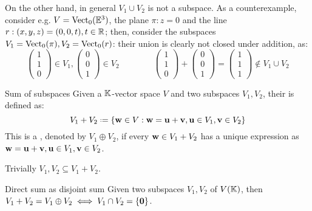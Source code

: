On the other hand, in general $ V_1 \cup V_2 $ is not a subspace. As a counterexample, consider e.g. $ V = \mathrm{Vect}_0(\mathbb{E}^3) $, the plane $ \pi : z = 0 $ and the line $ r : (x,y,z) = (0,0,t) , t \in \mathbb{R} $; then, consider the subspaces $ V_1 = \mathrm{Vect}_0(\pi) , V_2 = \mathrm{Vect}_0(r) $: their union is clearly not closed under addition, as:
\begin{equation*}
  \begin{pmatrix}
    1 \\ 1 \\ 0
  \end{pmatrix} \in V_1
  ,
  \begin{pmatrix}
    0 \\ 0 \\ 1
  \end{pmatrix} \in V_2
  \qquad \qquad
  \begin{pmatrix}
    1 \\ 1 \\ 0
  \end{pmatrix}
  +
  \begin{pmatrix}
    0 \\ 0 \\ 1
  \end{pmatrix}
  =
  \begin{pmatrix}
    1 \\ 1 \\ 1
  \end{pmatrix} \notin V_1 \cup V_2
\end{equation*}

\begin{definition}{Sum of subspaces}{}
  Given a $ \mathbb{K} $-vector space $ V $ and two subspaces $ V_1 , V_2 $, their  is defined as:
  \begin{equation*}
    V_1 + V_2 \defeq \{\ve{w} \in V : \ve{w} = \ve{u} + \ve{v}, \ve{u} \in V_1, \ve{v} \in V_2\}
  \end{equation*}
  This is a , denoted by $ V_1 \oplus V_2 $, if every $ \mathbf{w} \in V_1 + V_2 $ has a unique expression as $ \mathbf{w} = \mathbf{u} + \mathbf{v} , \mathbf{u} \in V_1 , \mathbf{v} \in V_2 $.
\end{definition}

Trivially $ V_1 , V_2 \subseteq V_1 + V_2 $.

\begin{lemma}{Direct sum as disjoint sum}{}
  Given two subspaces $ V_1 , V_2 $ of $ V(\mathbb{K}) $, then $ V_1 + V_2 = V_1 \oplus V_2 \iff V_1 \cap V_2 = \{\mathbf{0}\} $.
\end{lemma}

